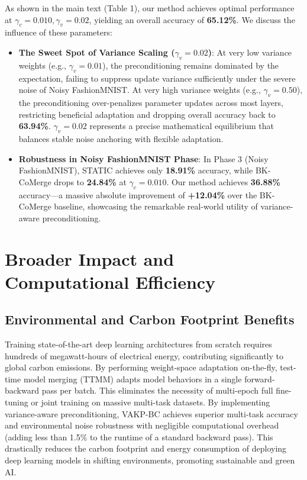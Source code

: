 \documentclass{article}
\theoremstyle{plain}
\theoremstyle{definition}
\theoremstyle{remark}
\begin{document}
As shown in the main text (Table 1), our method achieves optimal performance at $\gamma_c = 0.010, \gamma_v = 0.02$, yielding an overall accuracy of \textbf{65.12\%}. We discuss the influence of these parameters:
\begin{itemize}
    \item \textbf{The Sweet Spot of Variance Scaling ($\gamma_v = 0.02$)}: At very low variance weights (e.g., $\gamma_v = 0.01$), the preconditioning remains dominated by the expectation, failing to suppress update variance sufficiently under the severe noise of Noisy FashionMNIST. At very high variance weights (e.g., $\gamma_v = 0.50$), the preconditioning over-penalizes parameter updates across most layers, restricting beneficial adaptation and dropping overall accuracy back to \textbf{63.94\%}. $\gamma_v = 0.02$ represents a precise mathematical equilibrium that balances stable noise anchoring with flexible adaptation.
    \item \textbf{Robustness in Noisy FashionMNIST Phase}: In Phase 3 (Noisy FashionMNIST), STATIC achieves only \textbf{18.91\%} accuracy, while BK-CoMerge drops to \textbf{24.84\%} at $\gamma_c = 0.010$. Our method achieves \textbf{36.88\%} accuracy—a massive absolute improvement of \textbf{+12.04\%} over the BK-CoMerge baseline, showcasing the remarkable real-world utility of variance-aware preconditioning.
\end{itemize}

\section{Broader Impact and Computational Efficiency}
\label{sec:appendix_impact}

\subsection{Environmental and Carbon Footprint Benefits}
Training state-of-the-art deep learning architectures from scratch requires hundreds of megawatt-hours of electrical energy, contributing significantly to global carbon emissions. By performing weight-space adaptation on-the-fly, test-time model merging (TTMM) adapts model behaviors in a single forward-backward pass per batch. This eliminates the necessity of multi-epoch full fine-tuning or joint training on massive multi-task datasets. By implementing variance-aware preconditioning, VAKP-BC achieves superior multi-task accuracy and environmental noise robustness with negligible computational overhead (adding less than 1.5\% to the runtime of a standard backward pass). This drastically reduces the carbon footprint and energy consumption of deploying deep learning models in shifting environments, promoting sustainable and green AI.
\end{document}
